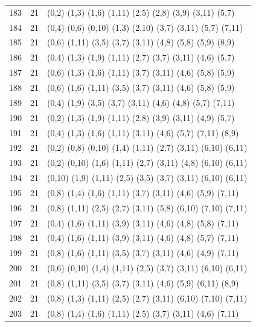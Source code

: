 \begin{appendix}
{\begin{longtable}{lll}
    183& 21 & (0,2)   (1,3)   (1,6)   (1,11)  (2,5)   (2,8)   (3,9)   (3,11)  (5,7)\\
    184& 21 & (0,4)   (0,6)   (0,10)  (1,3)   (2,10)  (3,7)   (3,11)  (5,7)   (7,11)\\
    185& 21 & (0,6)   (1,11)  (3,5)   (3,7)   (3,11)  (4,8)   (5,8)   (5,9)   (8,9)\\
    186& 21 & (0,4)   (1,3)   (1,9)   (1,11)  (2,7)   (3,7)   (3,11)  (4,6)   (5,7)\\
    187& 21 & (0,6)   (1,3)   (1,6)   (1,11)  (3,7)   (3,11)  (4,6)   (5,8)   (5,9)\\
    188& 21 & (0,6)   (1,6)   (1,11)  (3,5)   (3,7)   (3,11)  (4,6)   (5,8)   (5,9)\\
    189& 21 & (0,4)   (1,9)   (3,5)   (3,7)   (3,11)  (4,6)   (4,8)   (5,7)   (7,11)\\
    190& 21 & (0,2)   (1,3)   (1,9)   (1,11)  (2,8)   (3,9)   (3,11)  (4,9)   (5,7)\\
    191& 21 & (0,4)   (1,3)   (1,6)   (1,11)  (3,11)  (4,6)   (5,7)   (7,11)  (8,9)\\
    192& 21 & (0,2)   (0,8)   (0,10)  (1,4)   (1,11)  (2,7)   (3,11)  (6,10)  (6,11)\\
    193& 21 & (0,2)   (0,10)  (1,6)   (1,11)  (2,7)   (3,11)  (4,8)   (6,10)  (6,11)\\
    194& 21 & (0,10)  (1,9)   (1,11)  (2,5)   (3,5)   (3,7)   (3,11)  (6,10)  (6,11)\\
    195& 21 & (0,8)   (1,4)   (1,6)   (1,11)  (3,7)   (3,11)  (4,6)   (5,9)   (7,11)\\
    196& 21 & (0,8)   (1,11)  (2,5)   (2,7)   (3,11)  (5,8)   (6,10)  (7,10)  (7,11)\\
    197& 21 & (0,4)   (1,6)   (1,11)  (3,9)   (3,11)  (4,6)   (4,8)   (5,8)   (7,11)\\
    198& 21 & (0,4)   (1,6)   (1,11)  (3,9)   (3,11)  (4,6)   (4,8)   (5,7)   (7,11)\\
    199& 21 & (0,8)   (1,6)   (1,11)  (3,5)   (3,7)   (3,11)  (4,6)   (4,9)   (7,11)\\
    200& 21 & (0,6)   (0,10)  (1,4)   (1,11)  (2,5)   (3,7)   (3,11)  (6,10)  (6,11)\\
    201& 21 & (0,8)   (1,11)  (3,5)   (3,7)   (3,11)  (4,6)   (5,9)   (6,11)  (8,9)\\
    202& 21 & (0,8)   (1,3)   (1,11)  (2,5)   (2,7)   (3,11)  (6,10)  (7,10)  (7,11)\\
    203& 21 & (0,8)   (1,4)   (1,6)   (1,11)  (2,5)   (3,7)   (3,11)  (4,6)   (7,11)\\

\end{longtable}}
\end{appendix}
